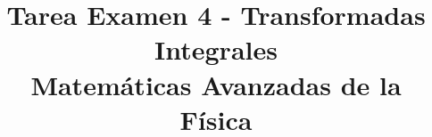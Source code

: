 
\usepackage{standalone}
\usepackage{tikz}   
\usepackage{tikz-3dplot}
\usetikzlibrary{decorations.pathmorphing,patterns}
\usepackage{enumerate}
\usepackage{pifont}
\renewcommand{\labelitemi}{\ding{43}}
\title{{Tarea Examen 4 - Transformadas Integrales} \\ {\large Matemáticas Avanzadas de la Física}}
\date{ }

\vspace{-4cm}
\renewcommand\labelenumii{\theenumi.{\arabic{enumii}})}
\maketitle
\fontsize{14}{14}\selectfont
